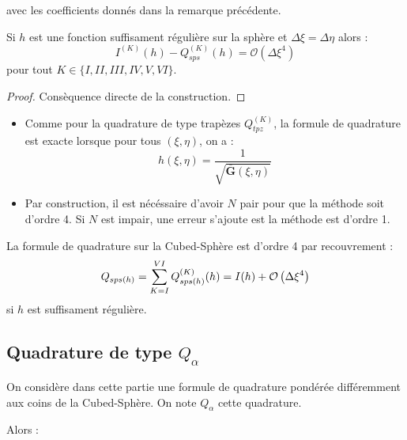 avec les coefficients donnés dans la remarque précédente.

\begin{proposition}
Si $h$ est une fonction suffisament régulière sur la sphère et $\Delta \xi = \Delta \eta$ alors :
\begin{equation}
I^{(K)}(h) - Q^{(K)}_{sps}(h) = \mathcal{O} \left( \Delta \xi^4 \right)
\end{equation}
pour tout $K \in \lbrace I, II, III, IV, V, VI \rbrace$.
\label{prop:consistance sps panel}
\end{proposition}

\begin{proof}
Consèquence directe de la construction.
\end{proof}

\begin{remarque}
\begin{itemize}
\item Comme pour la quadrature de type trapèzes $Q_{tpz}^{(K)}$, la formule de quadrature est exacte lorsque pour tous $(\xi,\eta)$, on a :
\begin{equation}
h(\xi,\eta)=\dfrac{1}{\sqrt{\overline{\mathbf{G}}(\xi,\eta)}}
\end{equation}
\item Par construction, il est nécéssaire d'avoir $N$ pair pour que la méthode soit d'ordre 4. Si $N$ est impair, une erreur s'ajoute est la méthode est d'ordre 1.
\end{itemize}
\end{remarque}

\begin{corollaire}
La formule de quadrature sur la Cubed-Sphère est d'ordre 4 par recouvrement :
\begin{equation}
Q_{sps(h)}=\displaystyle\sum\limits_{K=I}^{VI} Q_{sps(h)}^{(K)}(h) = I(h) + \mathcal{O} \left( \Delta \xi^4 \right)
\end{equation}
si $h$ est suffisament régulière.
\end{corollaire}


\subsection{Quadrature de type \texorpdfstring{$Q_{\alpha}$}{a}}

On considère dans cette partie une formule de quadrature pondérée différemment aux coins de la Cubed-Sphère. On note $Q_{\alpha}$ cette quadrature.

Alors :

